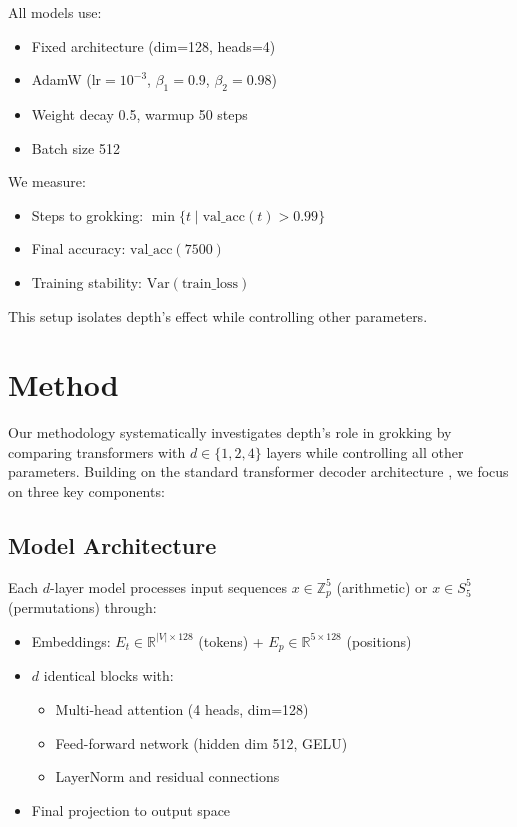 \documentclass{article} %
\begin{document}
All models use:
\begin{itemize}
    \item Fixed architecture (dim=128, heads=4)
    \item AdamW ($\text{lr}=10^{-3}$, $\beta_1=0.9$, $\beta_2=0.98$)
    \item Weight decay 0.5, warmup 50 steps
    \item Batch size 512
\end{itemize}

We measure:
\begin{itemize}
    \item Steps to grokking: $\min\{t \mid \text{val\_acc}(t) > 0.99\}$
    \item Final accuracy: $\text{val\_acc}(7500)$
    \item Training stability: $\text{Var}(\text{train\_loss})$
\end{itemize}

This setup isolates depth's effect while controlling other parameters.

\section{Method}
\label{sec:method}

Our methodology systematically investigates depth's role in grokking by comparing transformers with $d \in \{1,2,4\}$ layers while controlling all other parameters. Building on the standard transformer decoder architecture \citep{vaswani2017attention}, we focus on three key components:

\subsection{Model Architecture}
Each $d$-layer model processes input sequences $x \in \mathbb{Z}_p^5$ (arithmetic) or $x \in S_5^5$ (permutations) through:
\begin{itemize}
    \item Embeddings: $E_t \in \mathbb{R}^{|V| \times 128}$ (tokens) + $E_p \in \mathbb{R}^{5 \times 128}$ (positions)
    \item $d$ identical blocks with:
    \begin{itemize}
        \item Multi-head attention (4 heads, dim=128)
        \item Feed-forward network (hidden dim 512, GELU)
        \item LayerNorm \citep{ba2016layer} and residual connections
    \end{itemize}
    \item Final projection to output space
\end{itemize}
\end{document}
